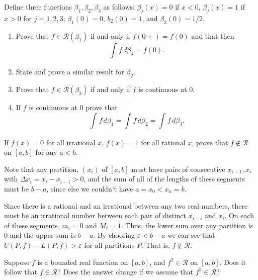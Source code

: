 \documentclass[12 pt, letterpaper]{hmcpset}
\begin{document}
\begin{problem}[3.]
	Define three functions  $\beta_{1}, \beta_{2}, \beta_{3}$ as follows: $\beta_{j}(x) = 0$ if $x < 0$, $\beta_{j}(x) = 1$ if $x > 0$ for  $j = 1, 2, 3$; $\beta_{1}(0) = 0$, $b_{2}(0) = 1$, and $\beta_{3}(0) = 1/2$.
	\begin{enumerate}
		\item Prove that $f \in \mathscr{R}(\beta_{1})$ if and only if $f(0+) = f(0)$ and that then
			\[
				\int_{} f \, d\beta_{1} = f(0).
			\]
		\item State and prove a similar result for $\beta_{2}$.
		\item Prove that $f \in \mathscr{R}(\beta_{3})$ if and only if $f$ is continuous at $0$.
		\item If $f$ is continuous at $0$ prove that
			\[
				\int_{} f \, d\beta_{1} = \int_{} f \, d\beta_{2} = \int_{} f \, d\beta_{3}.
			\]
	\end{enumerate}
\end{problem}

\pagebreak

\begin{problem}[4.]
	If $f(x) = 0$ for all irrational $x$, $f(x) = 1$ for all rational $x$, prove that $f \notin \mathscr{R}$ on $[a, b]$ for any $a < b$.
\end{problem}

\begin{solution}
	Note that any partition, $(x_{i})$ of $[a, b]$ must have pairs of consecutive $x_{i - 1}, x_{i}$ with $\Delta x_{i} = x_{i} - x_{i - 1} > 0$, and the sum of all of the lengths of these segments must be $b - a$, since else we couldn't have $a = x_{0} < x_{n} = b$.

	Since there is a rational and an irrational between any two real numbers, there must be an irrational number between each pair of distinct $x_{i - i}$ and $x_{i}$. On each of these segments, $m_{i} = 0$ and $M_{i} = 1$. Thus, the lower sum over any partition is $0$ and the upper sum is $b - a$. By choosing $\varepsilon < b - a$ we can see that $U(P, f) - L(P, f) > \varepsilon$ for all partitions $P$. That is, $f \notin \mathscr{R}$.
\end{solution}

\pagebreak

\begin{problem}[5.]
	Suppose $f$ is a bounded real function on $[a, b]$, and $f^{2} \in \mathscr{R}$ on $[a, b]$. Does it follow that $f \in \mathscr{R}$? Does the answer change if we assume that $f^{3} \in \mathscr{R}$?
\end{problem}
\end{document}
